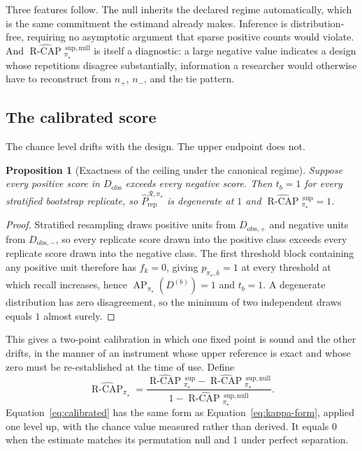 \documentclass[11pt]{article}
\newcommand{\AP}{\operatorname{AP}}
\newcommand{\Regime}{\mathcal{R}}
\newcommand{\RCAPHat}{\widehat{\operatorname{R\text{-}CAP}}{}^{\,\mathrm{sup}}_{\pi_\star}}
\newcommand{\RCAPnullHat}{\widehat{\operatorname{R\text{-}CAP}}{}^{\,\mathrm{sup,null}}_{\pi_\star}}
\newcommand{\RCAPcalHat}{\widehat{\operatorname{R\text{-}CAP}}_{\pi_\star}}
\newcommand{\PRepHat}{\widehat{P}_{\mathrm{rep}}^{\Regime,\pi_\star}}
\newtheorem{proposition}{Proposition}
\theoremstyle{remark}
\begin{document}
Three features follow. The null inherits the declared regime automatically, which is the same commitment the estimand already makes. Inference is distribution-free, requiring no asymptotic argument that sparse positive counts would violate. And $\RCAPnullHat$ is itself a diagnostic: a large negative value indicates a design whose repetitions disagree substantially, information a researcher would otherwise have to reconstruct from $n_+$, $n_-$, and the tie pattern.

\subsection{The calibrated score}

The chance level drifts with the design. The upper endpoint does not.

\begin{proposition}[Exactness of the ceiling under the canonical regime]
Suppose every positive score in $D_{\mathrm{obs}}$ exceeds every negative score. Then $t_b=1$ for every stratified bootstrap replicate, so $\PRepHat$ is degenerate at $1$ and $\RCAPHat=1$.
\end{proposition}

\begin{proof}
Stratified resampling draws positive units from $D_{\mathrm{obs},+}$ and negative units from $D_{\mathrm{obs},-}$, so every replicate score drawn into the positive class exceeds every replicate score drawn into the negative class. The first threshold block containing any positive unit therefore has $f_k=0$, giving $p_{\pi_\star,k}=1$ at every threshold at which recall increases, hence $\AP_{\pi_\star}(D^{(b)})=1$ and $t_b=1$. A degenerate distribution has zero disagreement, so the minimum of two independent draws equals $1$ almost surely.
\end{proof}

This gives a two-point calibration in which one fixed point is sound and the other drifts, in the manner of an instrument whose upper reference is exact and whose zero must be re-established at the time of use. Define
\begin{equation}
\RCAPcalHat
=
\frac{\RCAPHat-\RCAPnullHat}{1-\RCAPnullHat}.
\label{eq:calibrated}
\end{equation}
Equation~\eqref{eq:calibrated} has the same form as Equation~\eqref{eq:kappa-form}, applied one level up, with the chance value measured rather than derived. It equals $0$ when the estimate matches its permutation null and $1$ under perfect separation.
\end{document}

